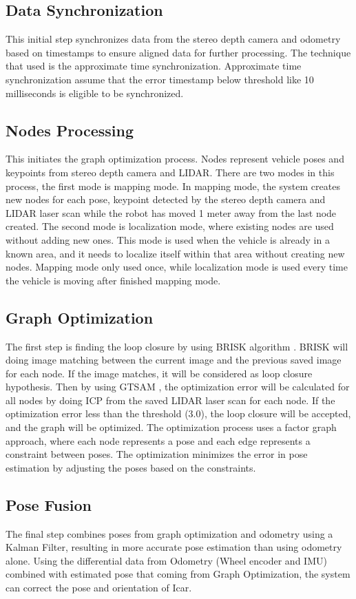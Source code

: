 \subsection{Data Synchronization} 
This initial step synchronizes data from the stereo depth camera and odometry based on timestamps to ensure aligned data for further processing. The technique that used is the approximate time synchronization. Approximate time synchronization assume that the error timestamp below threshold like 10 milliseconds is eligible to be synchronized. 

\subsection{Nodes Processing}
This initiates the graph optimization process. Nodes represent vehicle poses and keypoints from stereo depth camera and LIDAR. There are two modes in this process, the first mode is mapping mode. In mapping mode, the system creates new nodes for each pose, keypoint detected by the stereo depth camera and LIDAR laser scan while the robot has moved 1 meter away from the last node created. The second mode is localization mode, where existing nodes are used without adding new ones. This mode is used when the vehicle is already in a known area, and it needs to localize itself within that area without creating new nodes. Mapping mode only used once, while localization mode is used every time the vehicle is moving after finished mapping mode.

\subsection{Graph Optimization} 
The first step is finding the loop closure by using BRISK algorithm \cite{ref_brisk}. BRISK will doing image matching between the current image and the previous saved image for each node. If the image matches, it will be considered as loop closure hypothesis. Then by using GTSAM \cite{ref_gtsam}, the optimization error will be calculated for all nodes by doing ICP \cite{ref_icp} from the saved LIDAR laser scan for each node. If the optimization error less than the threshold (3.0), the loop closure will be accepted, and the graph will be optimized. The optimization process uses a factor graph approach, where each node represents a pose and each edge represents a constraint between poses. The optimization minimizes the error in pose estimation by adjusting the poses based on the constraints.

\subsection{Pose Fusion} 
The final step combines poses from graph optimization and odometry using a Kalman Filter, resulting in more accurate pose estimation than using odometry alone. Using the differential data from Odometry (Wheel encoder and IMU) combined with estimated pose that coming from Graph Optimization, the system can correct the pose and orientation of Icar. 

